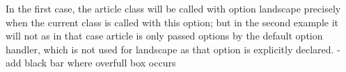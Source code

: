 In the first case, the article class will be called with option landscape precisely when the current class is called with this option; but in the second example it will not as in that case article is only passed options by the default option handler, which is not used for landscape as that option is explicitly declared.
\overfullrule=2cm
-	add black bar where overfull box occurs


